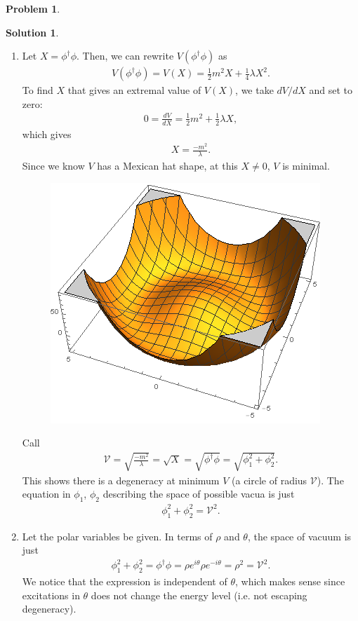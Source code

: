 \documentclass{book}
\numberwithin{equation}{section}
\theoremstyle{definition}
\newtheorem{prob}{Problem}[section]
\newtheorem{sln}{Solution}[section]
\newcommand{\V}{\mathcal{V}}
\begin{document}
\begin{prob}
\begin{sln}
\begin{enumerate}
			
			
			
			\item  Let $X = \phi^\dagger\phi$. Then, we can rewrite $V(\phi^\dagger\phi)$ as
			\begin{align}
			V(\phi^\dagger\phi) = V(X) = \frac{1}{2}m^2X + \frac{1}{4}\lambda X^2.
			\end{align}
			To find $X$ that gives an extremal value of $V(X)$, we take $dV/dX$ and set to zero:
			\begin{align}
			0 = \frac{dV}{dX} = \frac{1}{2}m^2 + \frac{1}{2}\lambda X,
			\end{align}
			which gives
			\begin{align}
			X = \frac{-m^2}{\lambda}.
			\end{align}
			Since we know $V$ has a Mexican hat shape, at this $X\neq 0$, $V$ is minimal. 
			\begin{figure}[h!]
				\centering
				\includegraphics[scale=1]{hat.png}
			\end{figure}
			
			
			Call
			\begin{align}
			\V = \sqrt{\frac{-m^2}{\lambda}} = \sqrt{X} = \sqrt{\phi^\dagger\phi} = \sqrt{\phi_1^2 + \phi_2^2}.
			\end{align}
			This shows there is a degeneracy at minimum $V$ (a circle of radius $\V$). The equation in $\phi_1$, $\phi_2$ describing the space of possible vacua is just
			\begin{align}
			\phi_1^2 + \phi_2^2 = \V^2.
			\end{align}
			
			
			
			
			\item Let the polar variables be given. In terms of $\rho$ and $\theta$, the space of vacuum is just
			\begin{align}
			\phi_1^2 + \phi_2^2 = \phi^\dagger\phi = \rho e^{i\theta}\rho e^{-i\theta} = \rho^2 = \V^2.
			\end{align}
			We notice that the expression is independent of $\theta$, which makes sense since excitations in $\theta$ does not change the energy level (i.e. not escaping degeneracy).
			

\end{enumerate}
\end{sln}
\end{prob}
\end{document}
